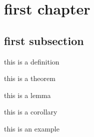 \chapter{first chapter} 

\section{first subsection}

\begin{defn}[number]
    this is a definition
\end{defn}

\begin{thm}[Numbers]
    this is a theorem
\end{thm}

\begin{lem}[letter]
    this is a lemma
\end{lem}

\begin{cor}[letters]
    this is a corollary
\end{cor}

\begin{eg}[math]
    this is an example
\end{eg}

 
